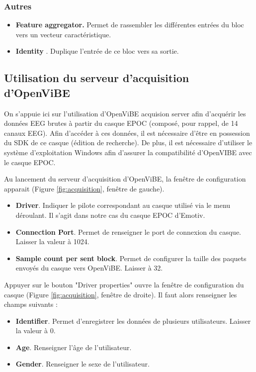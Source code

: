 \subsubsection{Autres}
\label{Subsubsection : 5.Autres}
\begin{itemize}
	\smallbreak
	\item \textbf{Feature aggregator.} Permet de rassembler les différentes entrées du bloc vers un vecteur caractéristique.
	\smallbreak
	\item\textbf{Identity }. Duplique l'entrée de ce bloc vers sa sortie.
\end{itemize}


\subsection {Utilisation du serveur d'acquisition d'OpenViBE}
\label{Subsection : 5.Utilisation de OpenViBE acquisition Server}
On s'appuie ici sur l'utilisation d'OpenViBE acquision server afin d'acquérir les données EEG brutes à partir du casque EPOC (composé, pour rappel, de 14 canaux EEG). Afin d'accéder à ces données, il est nécessaire d'être en possession du SDK de ce casque (édition de recherche). De plus, il est nécessaire d'utiliser le système d'exploitation Windows afin d'assurer la compatibilité d'OpenVIBE avec le casque EPOC.

Au lancement du serveur d'acquisition d'OpenViBE, la fenêtre de configuration apparait (Figure \ref{fig:acquisition}, fenêtre de gauche).
\smallbreak
\begin{itemize}
	\item \textbf{Driver}. Indiquer le pilote correspondant au casque utilisé via le menu déroulant. Il s'agit dans notre cas du casque EPOC d'Emotiv.
	\smallbreak
	\item \textbf{Connection Port}. Permet de renseigner le port de connexion du casque. Laisser la valeur à 1024.
	\smallbreak
	\item \textbf{Sample count per sent block}. Permet de configurer la taille des paquets envoyés du casque vers OpenViBE. Laisser à 32.
	\smallbreak
\end{itemize} 

Appuyer sur le bouton "Driver properties" ouvre la fenêtre de configuration du casque (Figure \ref{fig:acquisition}, fenêtre de droite). Il faut alors renseigner les champs suivants :
\smallbreak
\begin{itemize}
	\item \textbf{Identifier}. Permet d'enregistrer les données de plusieurs utilisateurs. Laisser la valeur à 0.
	\smallbreak
	\item \textbf{Age}. Renseigner l'âge de l'utilisateur.
	\smallbreak
	\item \textbf{Gender}. Renseigner le sexe de l'utilisateur.
	\smallbreak
\end{itemize}


